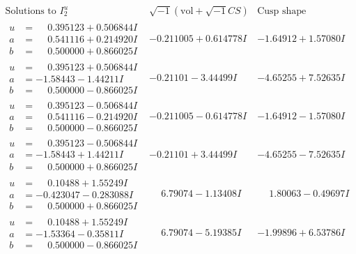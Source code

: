 \documentclass[1p]{elsarticle_modified}
\theoremstyle{definition}
\newcommand{\I}{\sqrt{-1}}
\begin{document}
$$\begin{array}{c|c|c}  
\text{Solutions to }I^u_{2}& \I (\text{vol} + \sqrt{-1}CS) & \text{Cusp shape}\\
 \hline 
\begin{aligned}
u &= \phantom{-}0.395123 + 0.506844 I \\
a &= \phantom{-}0.541116 + 0.214920 I \\
b &= \phantom{-}0.500000 + 0.866025 I\end{aligned}
 & -0.211005 + 0.614778 I & -1.64912 + 1.57080 I \\ \hline\begin{aligned}
u &= \phantom{-}0.395123 + 0.506844 I \\
a &= -1.58443 - 1.44211 I \\
b &= \phantom{-}0.500000 - 0.866025 I\end{aligned}
 & -0.21101 - 3.44499 I & -4.65255 + 7.52635 I \\ \hline\begin{aligned}
u &= \phantom{-}0.395123 - 0.506844 I \\
a &= \phantom{-}0.541116 - 0.214920 I \\
b &= \phantom{-}0.500000 - 0.866025 I\end{aligned}
 & -0.211005 - 0.614778 I & -1.64912 - 1.57080 I \\ \hline\begin{aligned}
u &= \phantom{-}0.395123 - 0.506844 I \\
a &= -1.58443 + 1.44211 I \\
b &= \phantom{-}0.500000 + 0.866025 I\end{aligned}
 & -0.21101 + 3.44499 I & -4.65255 - 7.52635 I \\ \hline\begin{aligned}
u &= \phantom{-}0.10488 + 1.55249 I \\
a &= -0.423047 - 0.283088 I \\
b &= \phantom{-}0.500000 + 0.866025 I\end{aligned}
 & \phantom{-}6.79074 - 1.13408 I & \phantom{-}1.80063 - 0.49697 I \\ \hline\begin{aligned}
u &= \phantom{-}0.10488 + 1.55249 I \\
a &= -1.53364 - 0.35811 I \\
b &= \phantom{-}0.500000 - 0.866025 I\end{aligned}
 & \phantom{-}6.79074 - 5.19385 I & -1.99896 + 6.53786 I \\ \hline\begin{aligned}

\end{aligned}
\end{array}$$
\end{document}
